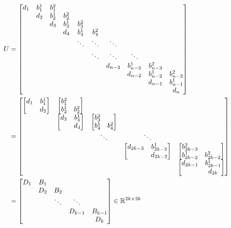 \documentclass[11pt]{article}
\begin{document}
\begin{align*}
    U &= \mqty[
        d_{1} & b^{1}_{1} & b^{2}_{1} &   &   &   &   &   &  \\
          & d_{2} & b^{1}_{2} & b^{2}_{2} &   &   &   &   &  \\
          &   & d_{3} & b^{1}_{3} & b^{2}_{3} &   &   &   &  \\
          &   &   & d_{4} & b^{1}_{4} & b^{2}_{4} &   &   &  \\
          &   &   &   & \ddots & \ddots & \ddots &   &  \\
          &   &   &   && \ddots & \ddots & \ddots &  \\
          &   &   &   &&   & d_{n-3} & b^{1}_{n-3} & b^{2}_{n-3} &  \\
          &   &   &   &&   &   & d_{n-2} & b^{1}_{n-2} & b^{2}_{n-2}\\
          &   &   &   &&   &   &   & d_{n-1} & b^{1}_{n-1}\\
          &   &   &   &&  &   &   &   & d_{n}
    ]\\
    &= \mqty[
        \mqty[d_{1} & b^{1}_{1} \\ & d_{2}] & \mqty[b^{2}_{1} &  \\ b^{1}_{2} & b^{2}_{2}] &   &   &  \\
          & \mqty[d_{3} & b^{1}_{3} \\ & d_{4}] & \mqty[b^{2}_{3} & \\ b^{1}_{4} & b^{2}_{4}] &   &  \\
          &   & \ddots & \ddots &  \\
          &   &   & \mqty[d_{2k-3} & b^{1}_{2k-3} \\ & d_{2k-2}] & \mqty[b^{2}_{2k-3} & \\ b^{1}_{2k-2} & b^{2}_{2k-2}] \\
          &   &   &   & \mqty[d_{2k-1} & b^{1}_{2k-1}\\ & d_{2k}]
    ]\\
    &= \mqty[
        D_{1} & B_{1} &   &   &  \\
          & D_{2} & B_{2} &   &  \\
          &   & \ddots & \ddots &  \\
          &   &   & D_{k-1} & B_{k-1}\\
          &   &   &   & D_{k}
    ] \in \mathbb{R}^{2k \times 2k}
\end{align*}
\end{document}
